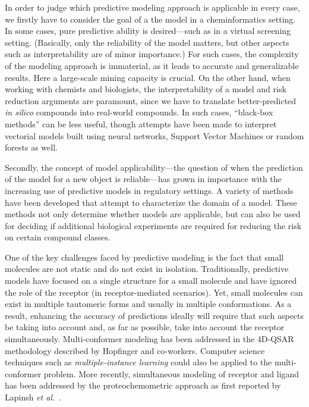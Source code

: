 \documentclass{sig-alternate}
\begin{document}
In order to judge which predictive modeling approach is applicable in every case, we firstly have to consider the goal
of a the model in a cheminformatics setting. In some cases, pure predictive ability is
desired---such as in a virtual screening setting. (Basically, only the reliability of the model matters, but other
aspects such as interpretability are of minor importance.) For such cases, the
complexity of the modeling approach is immaterial, as it leads to
accurate and generalizable results. Here a large-scale mining capacity
is crucial. On the other hand, when working with chemists and
biologists, the interpretability of a model and risk reduction
arguments are paramount, since we have to translate better-predicted
\emph{in silico} compounds into real-world compounds. In such cases,
``black-box methods'' can be less useful, though attempts have been made
to interpret vectorial models built using neural networks, Support Vector Machines or
random forests as well.

Secondly, the concept of model applicability---the question of when the prediction of the model
for a new object is reliable---has grown in importance with
the increasing use of predictive models in regulatory settings. A
variety of methods have been developed that attempt to characterize
the domain of a model. These methods not only determine whether models
are applicable, but can also be used for deciding if additional
biological experiments are required for reducing the risk on certain
compound classes.

One of the key challenges faced by predictive modeling is the fact
that small molecules are not static and do not exist in
isolation. Traditionally, predictive models have focused on a single
structure for a small molecule and have ignored the role of the
receptor (in receptor-mediated scenarios). Yet, small molecules can
exist in multiple tautomeric forms and usually in multiple
conformations. As a result, enhancing the accuracy of predictions
ideally will require that such aspects be taking into account and, as
far as possible, take into account the receptor
simultaneously. Multi-conformer modeling has been addressed in the
4D-QSAR methodology described by Hopfinger and co-workers.  Computer
science techniques such as \emph{multiple-instance learning} could
also be applied to the multi-conformer problem. More recently,
simultaneous modeling of receptor and ligand has been addressed by the
proteochemometric approach as first reported by Lapinsh
\textit{et al.}~\cite{lapinsh2001}.
\end{document}
